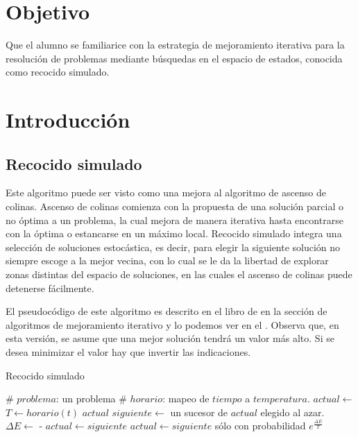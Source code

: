 \section{Objetivo}

Que el alumno se familiarice con la estrategia de mejoramiento iterativa para la resolución de problemas mediante búsquedas en el espacio de estados, conocida como recocido simulado.



\section{Introducción}

\subsection{Recocido simulado}

Este algoritmo puede ser visto como una mejora al algoritmo de ascenso de colinas.  Ascenso de colinas comienza con la propuesta de una solución parcial o no óptima a un problema, la cual mejora de manera iterativa hasta encontrarse con la óptima o estancarse en un máximo local.  Recocido simulado integra una selección de soluciones estocástica, es decir, para elegir la siguiente solución no siempre escoge a la mejor vecina, con lo cual se le da la libertad de explorar zonas distintas del espacio de soluciones, en las cuales el ascenso de colinas puede detenerse fácilmente.

El pseudocódigo de este algoritmo es descrito en el libro de  \cite{Russell2010} en la sección de algoritmos de mejoramiento iterativo y lo podemos ver en el .  Observa que, en esta versión, se asume que una mejor solución tendrá un valor más alto.  Si se desea minimizar el valor hay que invertir las indicaciones.

\begin{algorithm}
 \caption{Recocido simulado}\label{alg:annealing}
 \begin{algorithmic}
    \State \# $problema$: un problema
    \State \# $horario$: mapeo de $tiempo$ a $temperatura$.
    \State $actual \leftarrow $ 
      \State $T \leftarrow horario(t)$
        \State \Return $actual$
      \EndIf
      \State $siguiente \leftarrow$ un sucesor de $actual$ elegido al azar.
      \State $\Delta E \leftarrow$  - 
        \State $actual \leftarrow siguiente$
      \Else
        \State $actual \leftarrow siguiente$ sólo con probabilidad $e^{\frac{\Delta E}{T}}$
      \EndIf
    \EndFor
  \EndFunction
 \end{algorithmic}
\end{algorithm}



